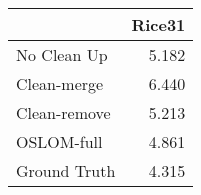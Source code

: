\begin{tabular}{lr}
\toprule
{} & Rice31 \\
\midrule
No Clean Up  &  5.182 \\
Clean-merge  &  6.440 \\
Clean-remove &  5.213 \\
OSLOM-full   &  4.861 \\
Ground Truth &  4.315 \\
\bottomrule
\end{tabular}
